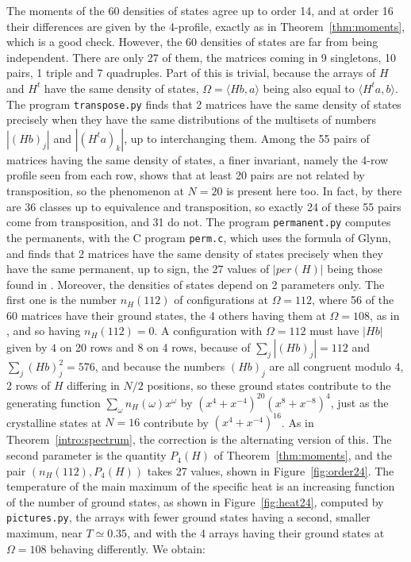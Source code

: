 \documentclass[11pt,a4paper]{article}
\theoremstyle{remark}
\begin{document}
The moments of the 60 densities of states agree up to order 14, and at order 16 their differences are given by the 4-profile, exactly as in Theorem~\ref{thm:moments}, which is a good check. However, the 60 densities of states are far from being independent. There are only 27 of them, the matrices coming in 9 singletons, 10 pairs, 1 triple and 7 quadruples. Part of this is trivial, because the arrays of $H$ and $H^t$ have the same density of states, $\Omega=\langle Hb,a\rangle$ being also equal to $\langle H^ta,b\rangle$. The program \texttt{transpose.py} finds that 2 matrices have the same density of states precisely when they have the same distributions of the multisets of numbers $|(Hb)_j|$ and $|(H^ta)_k|$, up to interchanging them. Among the 55 pairs of matrices having the same density of states, a finer invariant, namely the 4-row profile seen from each row, shows that at least 20 pairs are not related by transposition, so the phenomenon at $N=20$ is present here too. In fact, by \cite{wls} there are 36 classes up to equivalence and transposition, so exactly 24 of these 55 pairs come from transposition, and 31 do not. The program \texttt{permanent.py} computes the permanents, with the C program \texttt{perm.c}, which uses the formula of Glynn, and finds that 2 matrices have the same density of states precisely when they have the same permanent, up to sign, the 27 values of $|per(H)|$ being those found in \cite{wls}. Moreover, the densities of states depend on 2 parameters only. The first one is the number $n_H(112)$ of configurations at $\Omega=112$, where 56 of the 60 matrices have their ground states, the 4 others having them at $\Omega=108$, as in \cite{ckh}, and so having $n_H(112)=0$. A configuration with $\Omega=112$ must have $|Hb|$ given by $4$ on 20 rows and $8$ on 4 rows, because of $\sum_j|(Hb)_j|=112$ and $\sum_j(Hb)_j^2=576$, and because the numbers $(Hb)_j$ are all congruent modulo 4, 2 rows of $H$ differing in $N/2$ positions, so these ground states contribute to the generating function $\sum_\omega n_H(\omega)x^\omega$ by $(x^4+x^{-4})^{20}(x^8+x^{-8})^4$, just as the crystalline states at $N=16$ contribute by $(x^4+x^{-4})^{16}$. As in Theorem~\ref{intro:spectrum}, the correction is the alternating version of this. The second parameter is the quantity $P_4(H)$ of Theorem~\ref{thm:moments}, and the pair $(n_H(112),P_4(H))$ takes 27 values, shown in Figure~\ref{fig:order24}. The temperature of the main maximum of the specific heat is an increasing function of the number of ground states, as shown in Figure~\ref{fig:heat24}, computed by \texttt{pictures.py}, the arrays with fewer ground states having a second, smaller maximum, near $T\simeq0.35$, and with the 4 arrays having their ground states at $\Omega=108$ behaving differently. We obtain:
\end{document}
